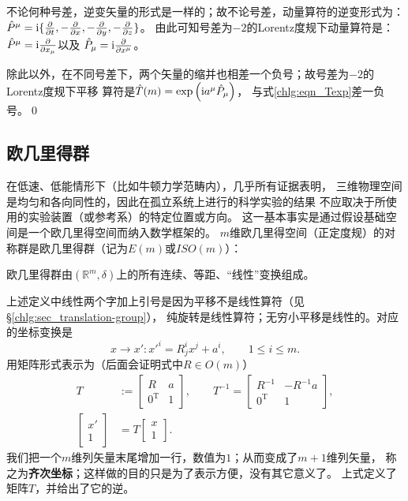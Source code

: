 不论何种号差，逆变矢量的形式是一样的；故不论号差，动量算符的逆变形式为：
$\hat{P}^\mu=\mathrm{i} \{\frac{\partial}{\partial t}, -\frac{\partial}{\partial x},
-\frac{\partial}{\partial y},-\frac{\partial}{\partial z}\}$。
由此可知号差为$-2$的Lorentz度规下动量算符是：
$\hat{P}^\mu = \mathrm{i} \frac{\partial }{\partial x_\mu}$以及
$\hat{P}_\mu = \mathrm{i} \frac{\partial }{\partial x^\mu}$。

除此以外，在不同号差下，两个矢量的缩并也相差一个负号；故号差为$-2$的Lorentz度规下平移
算符是$\hat{T}(m) = \exp\left(\mathrm{i} a^\mu \hat{P}_\mu  \right) $，
与式\eqref{chlg:eqn_Texp}差一负号。\qed

\subsection{欧几里得群}\label{chlg:sec_Euclidean-group}
在低速、低能情形下（比如牛顿力学范畴内），几乎所有证据表明，
三维物理空间是均匀和各向同性的，因此在孤立系统上进行的科学实验的结果
不应取决于所使用的实验装置（或参考系）的特定位置或方向。
这一基本事实是通过假设基础空间是一个欧几里得空间而纳入数学框架的。
$m$维欧几里得空间（正定度规）的对称群是欧几里得群（记为$E(m)$或$ISO(m)$）：
\begin{definition}
    欧几里得群由$(\mathbb{R}^m,\delta)$上的所有连续、等距、“线性”变换组成。
\end{definition}
上述定义中线性两个字加上引号是因为平移不是线性算符（见\S\ref{chlg:sec_translation-group}），
纯旋转是线性算符；无穷小平移是线性的。对应的坐标变换是
\begin{equation}
    x\to x' : x'^{i} = R^i_{ j}x^j + a^i ,\qquad  1 \leqslant i \leqslant m .
\end{equation}
用矩阵形式表示为（后面会证明式中$R\in O(m)$）
\begin{equation}\label{chlg:eqn_Em-max}
\begin{aligned}
    T&:=\begin{bmatrix}  R & a \\ 0^{\mathrm{T}} & 1  \end{bmatrix},\qquad T^{-1}=\begin{bmatrix}    R^{-1} & -R^{-1} a \\ 0^{\mathrm{T}} & 1    \end{bmatrix},\\
    \begin{bmatrix}  x' \\ 1 \end{bmatrix}&=T\begin{bmatrix}  x \\ 1 \end{bmatrix}.
\end{aligned}
\end{equation}
我们把一个$m$维列矢量末尾增加一行，数值为$1$；从而变成了$m+1$维列矢量，
称之为\textbf{齐次坐标}；这样做的目的只是为了表示方便，没有其它意义了。
上式定义了矩阵$T$，并给出了它的逆。

